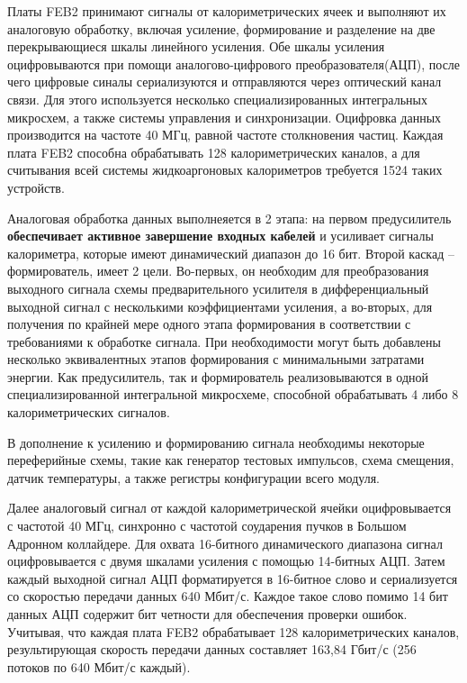 Платы FEB2 принимают сигналы от калориметрических ячеек и выполняют их аналоговую обработку, включая усиление, формирование и разделение на две перекрывающиеся шкалы линейного усиления. Обе шкалы усиления оцифровываются при помощи аналогово-цифрового преобразователя(АЦП), после чего цифровые синалы сериализуются и отправляются через оптический канал связи. Для этого используется несколько специализированных интегральных микросхем, а также системы управления и синхронизации. Оцифровка данных производится на частоте 40 МГц, равной частоте столкновения частиц. Каждая плата FEB2 способна обрабатывать 128 калориметрических каналов, а для считывания всей системы жидкоаргоновых калориметров требуется 1524 таких устройств.\par
Аналоговая обработка данных выполнеяется в 2 этапа: на первом предусилитель \textbf{обеспечивает активное завершение входных кабелей} и усиливает сигналы калориметра, которые имеют динамический диапазон до 16 бит. Второй каскад -- формирователь, имеет 2 цели. Во-первых, он необходим для преобразования выходного сигнала схемы предварительного усилителя в дифференциальный выходной сигнал с несколькими коэффициентами усиления, а во-вторых, для получения по крайней мере одного этапа формирования в соответствии с требованиями к обработке сигнала. При необходимости могут быть добавлены несколько эквивалентных этапов формирования с минимальными затратами энергии. Как предусилитель, так и формирователь реализовываются в одной специализированной интегральной микросхеме, способной обрабатывать 4 либо 8 калориметрических сигналов.\par
В дополнение к усилению и формированию сигнала необходимы некоторые переферийные схемы, такие как генератор тестовых импульсов, схема смещения, датчик температуры, а также регистры конфигурации всего модуля.\par
Далее аналоговый сигнал от каждой калориметрической ячейки оцифровывается с частотой 40 МГц, синхронно с частотой соударения пучков в Большом Адронном коллайдере. Для охвата 16-битного динамического диапазона сигнал оцифровывается с двумя шкалами усиления с помощью 14-битных АЦП. Затем каждый выходной сигнал АЦП форматируется в 16-битное слово и сериализуется со скоростью передачи данных 640 Мбит/с. Каждое такое слово помимо 14 бит данных АЦП содержит бит четности для обеспечения проверки ошибок. Учитывая, что каждая плата FEB2 обрабатывает 128 калориметрических каналов, результирующая скорость передачи данных составляет 163,84 Гбит/с (256 потоков по 640 Мбит/с каждый).\par
